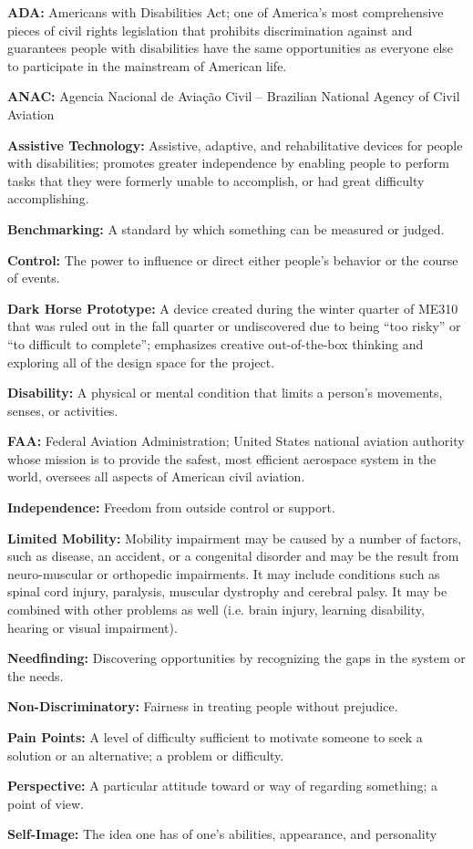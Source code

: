   \item  \textbf{ADA:} Americans with Disabilities Act; one of America's most comprehensive pieces of civil rights legislation that prohibits discrimination against and guarantees people with disabilities have the same opportunities as everyone else to participate in the mainstream of American life.
  \item \textbf{ANAC:} Agencia Nacional de Aviação Civil – Brazilian National Agency of Civil Aviation
  \item  \textbf{Assistive Technology:} Assistive, adaptive, and rehabilitative devices for people with disabilities; promotes greater independence by enabling people to perform tasks that they were formerly unable to accomplish, or had great difficulty accomplishing.
  \item  \textbf{Benchmarking:} A standard by which something can be measured or judged.
  \item \textbf{Control:} The power to influence or direct either people's behavior or the course of events.
  \item \textbf{Dark Horse Prototype:} A device created during the winter quarter of ME310 that was ruled out in the fall quarter or undiscovered due to being “too risky” or “to difficult to complete”; emphasizes creative out-of-the-box thinking and exploring all of the design space for the project. 
  \item \textbf{Disability:} A physical or mental condition that limits a person's movements, senses, or activities.
  \item \textbf{FAA:} Federal Aviation Administration; United States national aviation authority whose mission is to provide the safest, most efficient aerospace system in the world, oversees all aspects of American civil aviation.
  \item \textbf{Independence:} Freedom from outside control or support.
  \item \textbf{Limited Mobility:} Mobility impairment may be caused by a number of factors, such as disease, an accident, or a congenital disorder and may be the result from neuro-muscular or orthopedic impairments. It may include conditions such as spinal cord injury, paralysis, muscular dystrophy and cerebral palsy. It may be combined with other problems as well (i.e. brain injury, learning disability, hearing or visual impairment).
  \item \textbf{Needfinding:} Discovering opportunities by recognizing the gaps in the system or the needs.
  \item \textbf{Non-Discriminatory:} Fairness in treating people without prejudice.
  \item \textbf{Pain Points:} A level of difficulty sufficient to motivate someone to seek a solution or an alternative; a problem or difficulty.
  \item \textbf{Perspective:} A particular attitude toward or way of regarding something; a point of view.
  \item \textbf{Self-Image:} The idea one has of one's abilities, appearance, and personality